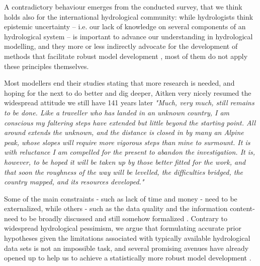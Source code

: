 \documentclass[10pt,a4paper]{article}
\begin{document}
A contradictory behaviour emerges from the conducted survey, that we think holds also for the international hydrological community: while hydrologists think epistemic uncertainty -- i.e. our lack of knowledge on several components of an hydrological system -- is important to advance our understanding in hydrological modelling, and they more or less indirectly advocate for the development of methods that facilitate robust model development \citep{Zheng2018}, most of them do not apply these principles themselves.

Most modellers end their studies stating that more research is needed, and hoping for the next to do better and dig deeper, Aitken very nicely resumed the widespread attitude we still have 141 years later \textit{"Much, very much, still remains to be done. Like a traveller who has landed in an unknown country, I am conscious my faltering steps have extended but little beyond the starting point. All around extends the unknown, and the distance is closed in by many an Alpine peak, whose slopes will require more vigorous steps than mine to surmount. It is with reluctance I am compelled for the present to abandon the investigation. It is, however, to be hoped it will be taken up by those better fitted for the work, and that soon the roughness of the way will be levelled, the difficulties bridged, the country mapped, and its resources developed."} \citep{Aitken1880}

Some of the main constraints - such as lack of time and money - need to be externalized, while others - such as the data quality and the information content- need to be broadly discussed and still somehow formalized \citep{Zheng2018}. Contrary to widespread hydrological pessimism, we argue that formulating accurate prior hypotheses given the limitations associated with typically available hydrological data sets is not an impossible task, and several promising avenues have already opened up to help us to achieve a statistically more robust model development \citep{Renard2010, Zheng2018}.
\end{document}
